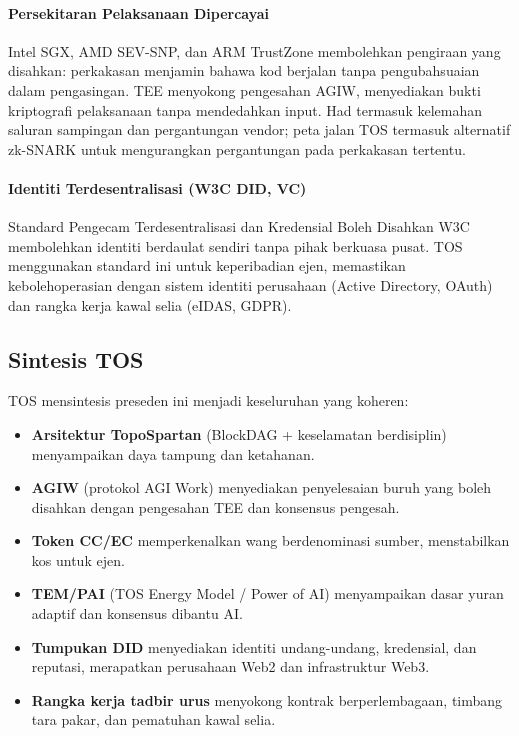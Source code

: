 \documentclass[11pt]{article}
\begin{document}
\paragraph{Persekitaran Pelaksanaan Dipercayai} Intel SGX, AMD SEV-SNP, dan ARM TrustZone membolehkan pengiraan yang disahkan: perkakasan menjamin bahawa kod berjalan tanpa pengubahsuaian dalam pengasingan. TEE menyokong pengesahan AGIW, menyediakan bukti kriptografi pelaksanaan tanpa mendedahkan input. Had termasuk kelemahan saluran sampingan dan pergantungan vendor; peta jalan TOS termasuk alternatif zk-SNARK untuk mengurangkan pergantungan pada perkakasan tertentu.

\paragraph{Identiti Terdesentralisasi (W3C DID, VC)} Standard Pengecam Terdesentralisasi dan Kredensial Boleh Disahkan W3C membolehkan identiti berdaulat sendiri tanpa pihak berkuasa pusat. TOS menggunakan standard ini untuk keperibadian ejen, memastikan kebolehoperasian dengan sistem identiti perusahaan (Active Directory, OAuth) dan rangka kerja kawal selia (eIDAS, GDPR).

\subsection{Sintesis TOS}
TOS mensintesis preseden ini menjadi keseluruhan yang koheren:
\begin{itemize}[noitemsep]
  \item \textbf{Arsitektur TopoSpartan} (BlockDAG + keselamatan berdisiplin) menyampaikan daya tampung dan ketahanan.
  \item \textbf{AGIW} (protokol AGI Work) menyediakan penyelesaian buruh yang boleh disahkan dengan pengesahan TEE dan konsensus pengesah.
  \item \textbf{Token CC/EC} memperkenalkan wang berdenominasi sumber, menstabilkan kos untuk ejen.
  \item \textbf{TEM/PAI} (TOS Energy Model / Power of AI) menyampaikan dasar yuran adaptif dan konsensus dibantu AI.
  \item \textbf{Tumpukan DID} menyediakan identiti undang-undang, kredensial, dan reputasi, merapatkan perusahaan Web2 dan infrastruktur Web3.
  \item \textbf{Rangka kerja tadbir urus} menyokong kontrak berperlembagaan, timbang tara pakar, dan pematuhan kawal selia.
\end{itemize}
\end{document}
